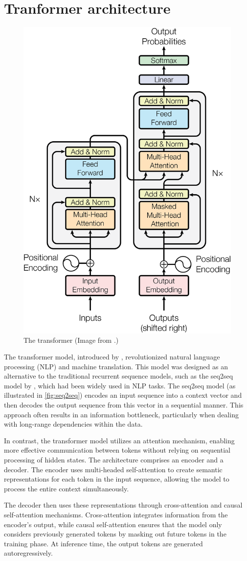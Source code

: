 \section{Tranformer architecture}
\begin{figure}[H]
    \centering
    \includegraphics[width=0.4\linewidth]{figures/transformer.png}
    \caption{The transformer (Image from \cite{transformer2017}.)}
\end{figure}
The transformer model, introduced by \cite{transformer2017}, revolutionized natural language processing (NLP) and machine translation. This model was designed as an alternative to the traditional recurrent sequence models, such as the seq2seq model by \cite{seq2seq}, which had been widely used in NLP tasks.
The seq2seq model (as illustrated in \cref{fig:seq2seq}) encodes an input sequence into a context vector and then decodes the output sequence from this vector in a sequential manner. This approach often results in an information bottleneck, particularly when dealing with long-range dependencies within the data.

In contrast, the transformer model utilizes an attention mechanism, enabling more effective communication between tokens without relying on sequential processing of hidden states. The architecture comprises an encoder and a decoder. The encoder uses multi-headed self-attention to create semantic representations for each token in the input sequence, allowing the model to process the entire context simultaneously.

The decoder then uses these representations through cross-attention and causal self-attention mechanisms. Cross-attention integrates information from the encoder's output, while causal self-attention ensures that the model only considers previously generated tokens by masking out future tokens in the training phase. At inference time, the output tokens are generated autoregressively. 

